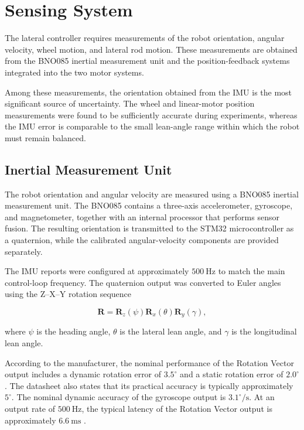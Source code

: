 \section{Sensing System}
\label{sec:sensing-system}

The lateral controller requires measurements of the robot orientation, angular velocity, wheel motion, and lateral rod motion. These measurements are obtained from the BNO085 inertial measurement unit and the position-feedback systems integrated into the two motor systems.

Among these measurements, the orientation obtained from the IMU is the most significant source of uncertainty. The wheel and linear-motor position measurements were found to be sufficiently accurate during experiments, whereas the IMU error is comparable to the small lean-angle range within which the robot must remain balanced.

\subsection{Inertial Measurement Unit}

The robot orientation and angular velocity are measured using a BNO085 inertial measurement unit. The BNO085 contains a three-axis accelerometer, gyroscope, and magnetometer, together with an internal processor that performs sensor fusion. The resulting orientation is transmitted to the STM32 microcontroller as a quaternion, while the calibrated angular-velocity components are provided separately.

The IMU reports were configured at approximately $500~\mathrm{Hz}$ to match the main control-loop frequency. The quaternion output was converted to Euler angles using the Z--X--Y rotation sequence

\begin{equation}
\mathbf{R}
=
\mathbf{R}_z(\psi)
\mathbf{R}_x(\theta)
\mathbf{R}_y(\gamma),
\label{eq:zxy-orientation}
\end{equation}

where $\psi$ is the heading angle, $\theta$ is the lateral lean angle, and $\gamma$ is the longitudinal lean angle.

According to the manufacturer, the nominal performance of the Rotation Vector output includes a dynamic rotation error of $3.5^\circ$ and a static rotation error of $2.0^\circ$. The datasheet also states that its practical accuracy is typically approximately $5^\circ$. The nominal dynamic accuracy of the gyroscope output is $3.1^\circ/\mathrm{s}$. At an output rate of $500~\mathrm{Hz}$, the typical latency of the Rotation Vector output is approximately $6.6~\mathrm{ms}$ \cite{bno08x_datasheet}.

